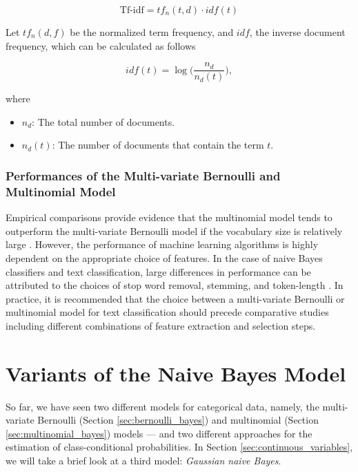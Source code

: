 \documentclass{article}
\begin{document}
\begin{equation}\text{Tf-idf} = tf_n(t,d) \cdot idf(t)\end{equation}

Let $tf_n(d,f)$ be the normalized term frequency, and $idf$, the inverse document frequency, which can be calculated as follows

\begin{equation}idf(t) = \log\Bigg(\frac{n_d}{n_d(t)}\Bigg), \end{equation}

where

\begin{itemize}
\item  $n_d$: The total number of documents.
\item  $n_d(t)$: The number of documents that contain the term $t$.
\end{itemize}

\subsubsection{Performances of the Multi-variate Bernoulli and Multinomial Model}

Empirical comparisons provide evidence that the multinomial model tends to outperform the multi-variate Bernoulli model if the vocabulary size is relatively large \cite{mccallum1998comparison}. However, the performance of machine learning algorithms is highly dependent on the appropriate choice of features. In the case of naive Bayes classifiers and text classification, large differences in performance can be attributed to the choices of  stop word removal, stemming, and token-length \cite{rudner2002automated}. In practice, it is recommended that the choice between a multi-variate Bernoulli or multinomial model for text classification should precede comparative studies including different combinations of feature extraction and selection steps.


\section{Variants of the Naive Bayes Model}
\label{sec:naive_bayes_variants}

So far, we have seen two different models for categorical data, namely, the multi-variate Bernoulli (Section \ref{sec:bernoulli_bayes}) and multinomial (Section \ref{sec:multinomial_bayes}) models --- and two different approaches for the estimation of class-conditional probabilities. In Section \ref{sec:continuous_variables}, we will take a brief look at a third model: \emph{Gaussian naive Bayes}.
\end{document}
